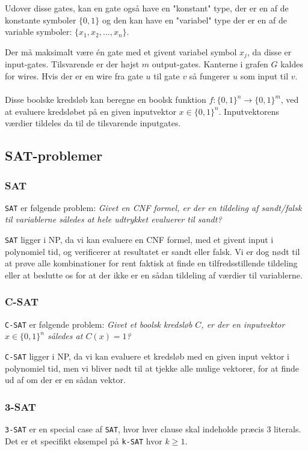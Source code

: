 \documentclass[danish,a4paper,article,12pt]{article}
\begin{document}
Udover disse gates, kan en gate også have en "konstant" type, der er en af de konstante symboler $\{0,1\}$ og den kan have en "variabel" type der er en af de variable symboler: $\{x_1,x_2,\dots,x_n\}$.

Der må maksimalt være én gate med et givent variabel symbol $x_j$, da disse er input-gates. Tilsvarende er der højst $m$ output-gates. Kanterne i grafen $G$ kaldes for wires. Hvis der er en wire fra gate $u$ til gate $v$ så fungerer $u$ som input til $v$.
\\
\\
Disse boolske kredsløb kan beregne en boolsk funktion $f:\{0,1\}^n\rightarrow \{0,1\}^m$, ved at evaluere kredsløbet på en given inputvektor $x\in \{0,1\}^n$. Inputvektorens værdier tildeles da til de tilsvarende inputgates.

\subsection{SAT-problemer}
\subsubsection{SAT}
\texttt{SAT} er følgende problem:
\emph{Givet en CNF formel, er der en tildeling af sandt/falsk til variablerne således at hele udtrykket evaluerer til sandt?}

\texttt{SAT} ligger i NP, da vi kan evaluere en CNF formel, med et givent input i polynomiel tid, og verificerer at resultatet er sandt eller falsk. Vi er dog nødt til at prøve alle kombinationer for rent faktisk at finde en tilfredsstillende tildeling eller at beslutte os for at der ikke er en sådan tildeling af værdier til variablerne.

\subsubsection{C-SAT}
\texttt{C-SAT} er følgende problem:
\emph{Givet et boolsk kredsløb $C$, er der en inputvektor $x\in \{0,1\}^n$ således at $C(x)=1$?}

\texttt{C-SAT} ligger i NP, da vi kan evaluere et kredsløb med en given input vektor i polynomiel tid, men vi bliver nødt til at tjekke alle mulige vektorer, for at finde ud af om der er en sådan vektor.

\subsubsection{3-SAT}
\texttt{3-SAT} er en special case af \texttt{SAT}, hvor hver clause skal indeholde præcis $3$ literals. Det er et specifikt eksempel på \texttt{k-SAT} hvor $k\geq 1$.
\end{document}
